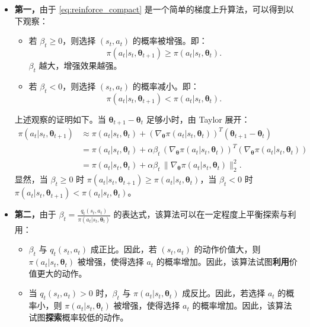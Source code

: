 \documentclass[UTF8]{article}
\begin{document}
\begin{itemize}
    \item \textbf{第一，}由于 \eqref{eq:reinforce_compact} 是一个简单的梯度上升算法，可以得到以下观察：
    \begin{itemize}
        \item 若 $\beta_t \geq 0$，则选择 $(s_t, a_t)$ 的概率被增强。即：
        \[
        \pi(a_t|s_t, \boldsymbol{\theta}_{t+1}) \geq \pi(a_t|s_t, \boldsymbol{\theta}_t).
        \]
        $\beta_t$ 越大，增强效果越强。
        \item 若 $\beta_t < 0$，则选择 $(s_t, a_t)$ 的概率减小。即：
        \[
        \pi(a_t|s_t, \boldsymbol{\theta}_{t+1}) < \pi(a_t|s_t, \boldsymbol{\theta}_t).
        \]
    \end{itemize}
    上述观察的证明如下。当 $\boldsymbol{\theta}_{t+1} - \boldsymbol{\theta}_t$ 足够小时，由 Taylor 展开：
    \begin{align*}
    \pi(a_t|s_t, \boldsymbol{\theta}_{t+1})
    &\approx \pi(a_t|s_t, \boldsymbol{\theta}_t) + (\nabla_{\boldsymbol{\theta}} \pi(a_t|s_t, \boldsymbol{\theta}_t))^T (\boldsymbol{\theta}_{t+1} - \boldsymbol{\theta}_t) \\
    &= \pi(a_t|s_t, \boldsymbol{\theta}_t) + \alpha \beta_t \, (\nabla_{\boldsymbol{\theta}} \pi(a_t|s_t, \boldsymbol{\theta}_t))^T (\nabla_{\boldsymbol{\theta}} \pi(a_t|s_t, \boldsymbol{\theta}_t)) \\
    &= \pi(a_t|s_t, \boldsymbol{\theta}_t) + \alpha \beta_t \, \| \nabla_{\boldsymbol{\theta}} \pi(a_t|s_t, \boldsymbol{\theta}_t) \|_2^2.
    \end{align*}
    显然，当 $\beta_t \geq 0$ 时 $\pi(a_t|s_t, \boldsymbol{\theta}_{t+1}) \geq \pi(a_t|s_t, \boldsymbol{\theta}_t)$，当 $\beta_t < 0$ 时 $\pi(a_t|s_t, \boldsymbol{\theta}_{t+1}) < \pi(a_t|s_t, \boldsymbol{\theta}_t)$。

    \item \textbf{第二，}由于 $\beta_t = \frac{q_t(s_t, a_t)}{\pi(a_t|s_t, \boldsymbol{\theta}_t)}$ 的表达式，该算法可以在一定程度上平衡探索与利用：
    \begin{itemize}
        \item $\beta_t$ 与 $q_t(s_t, a_t)$ 成正比。因此，若 $(s_t, a_t)$ 的动作价值大，则 $\pi(a_t|s_t, \boldsymbol{\theta}_t)$ 被增强，使得选择 $a_t$ 的概率增加。因此，该算法试图\textbf{利用}价值更大的动作。
        \item 当 $q_t(s_t, a_t) > 0$ 时，$\beta_t$ 与 $\pi(a_t|s_t, \boldsymbol{\theta}_t)$ 成反比。因此，若选择 $a_t$ 的概率小，则 $\pi(a_t|s_t, \boldsymbol{\theta}_t)$ 被增强，使得选择 $a_t$ 的概率增加。因此，该算法试图\textbf{探索}概率较低的动作。
    \end{itemize}
\end{itemize}
\end{document}
